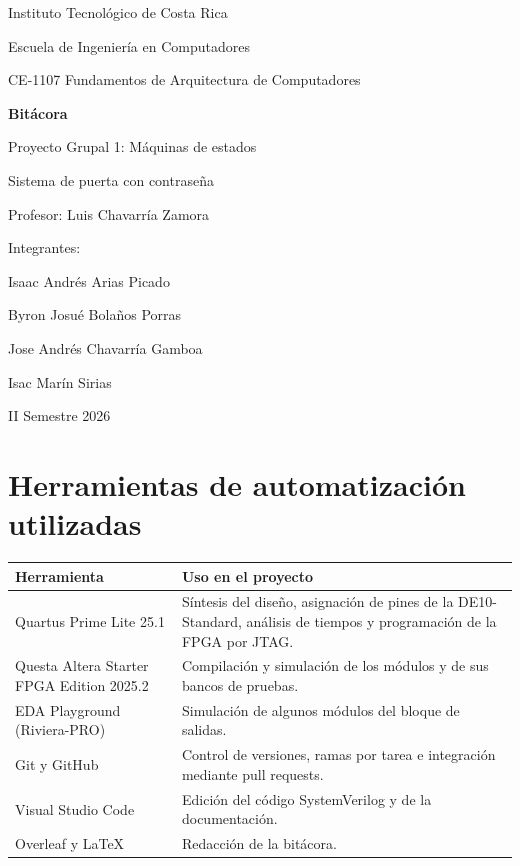 \documentclass[11pt,letterpaper]{article}
\begin{document}
\begin{titlepage}
  \centering
  {\large Instituto Tecnológico de Costa Rica\par}
  {\large Escuela de Ingeniería en Computadores\par}
  \vspace{1cm}
  {\large CE-1107 Fundamentos de Arquitectura de Computadores\par}
  \vspace{2cm}
  {\Huge\bfseries Bitácora\par}
  \vspace{0.5cm}
  {\Large Proyecto Grupal 1: Máquinas de estados\par}
  \vspace{0.3cm}
  {\large Sistema de puerta con contraseña\par}
  \vspace{2cm}
  {\large Profesor: Luis Chavarría Zamora\par}
  \vspace{1cm}
  {\large Integrantes:\par}
  \vspace{0.3cm}
  Isaac Andrés Arias Picado\par
  Byron Josué Bolaños Porras\par
  Jose Andrés Chavarría Gamboa\par
  Isac Marín Sirias\par
  \vfill
  {\large II Semestre 2026\par}
\end{titlepage}

\tableofcontents
\newpage

\section{Herramientas de automatización utilizadas}

\begin{table}[H]
\centering
\small
\begin{tabularx}{\textwidth}{l >{\raggedright\arraybackslash}X}
\toprule
\textbf{Herramienta} & \textbf{Uso en el proyecto} \\
\midrule
Quartus Prime Lite 25.1 & Síntesis del diseño, asignación de pines de la DE10-Standard, análisis de tiempos y programación de la FPGA por JTAG. \\
Questa Altera Starter FPGA Edition 2025.2 & Compilación y simulación de los módulos y de sus bancos de pruebas. \\
EDA Playground (Riviera-PRO) & Simulación de algunos módulos del bloque de salidas. \\
Git y GitHub & Control de versiones, ramas por tarea e integración mediante pull requests. \\
Visual Studio Code & Edición del código SystemVerilog y de la documentación. \\
Overleaf y \LaTeX & Redacción de la bitácora. \\
\bottomrule
\end{tabularx}
\end{table}
\end{document}
